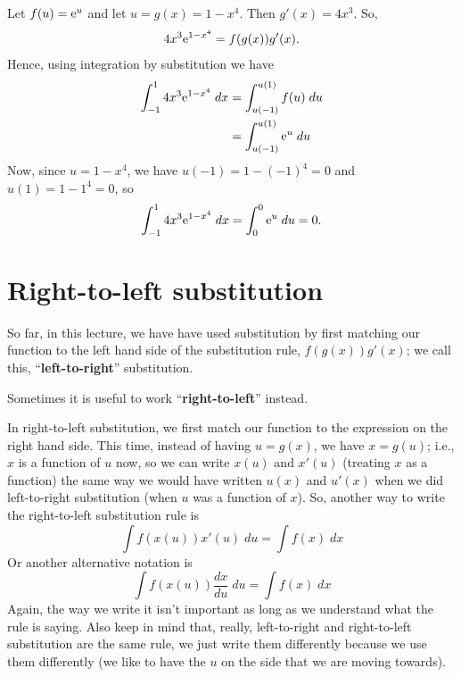 \solution
Let $f(u) = \mathrm{e}^u$ and let $u = g(x) = 1-x^4$. Then $g'(x) = 4x^3$. So,
\[
4x^3\mathrm{e}^{1-x^4} = f(g(x))g'(x).
\]
Hence, using integration by substitution we have
\begin{align*}
\int_{-1}^1 4x^3\mathrm{e}^{1-x^4} \; dx  & = \int_{u(-1)}^{u(1)} f(u) \; du \\
	& = \int_{u(-1)}^{u(1)} \mathrm{e}^u \; du
\end{align*}
Now, since $u = 1-x^4$, we have $u(-1) = 1 - (-1)^4 = 0$ and $u(1) = 1 - 1^4 = 0$, so
\[
\int_{-1}^1 4x^3\mathrm{e}^{1-x^4} \; dx = \int_{0}^{0} \mathrm{e}^u \; du = 0.
\]

\section{Right-to-left substitution} \label{right-to-left substitution}
So far, in this lecture, we have have used substitution by first matching our function to the left hand side of the substitution rule, $f(g(x))g'(x)$; we call this, ``\textbf{left-to-right}'' substitution.
\begin{center}
\end{center}
Sometimes it is useful to work ``\textbf{right-to-left}'' instead. 
\begin{center}
\end{center}
In right-to-left substitution, we first match our function to the expression on the right hand side. This time, instead of having $u = g(x)$, we have $x = g(u)$; i.e., $x$ is a function of $u$ now, so we can write $x(u)$ and $x'(u)$ (treating $x$ as a function) the same way we would have written $u(x)$ and $u'(x)$ when we did left-to-right substitution (when $u$ was a function of $x$). So, another way to write the right-to-left substitution rule is
\[
\int f(x(u))x'(u) \; du = \int f(x) \; dx
\]
Or another alternative notation is
\[
\int f(x(u))\frac{dx}{du} \; du = \int f(x) \; dx
\]
Again, the way we write it isn't important as long as we understand what the rule is saying. Also keep in mind that, really, left-to-right and right-to-left substitution are the same rule, we just write them differently because we use them differently (we like to have the $u$ on the side that we are moving towards).

